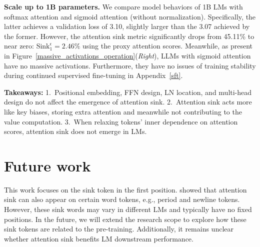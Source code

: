 \documentclass{article} \usepackage{iclr2025_conference,times}
\begin{document}
\textbf{Scale up to 1B parameters.} We compare model behaviors of 1B LMs with softmax attention and sigmoid attention (without normalization). Specifically, the latter achieves a validation loss of 3.10, slightly larger than the 3.07 achieved by the former. However, the attention sink metric significantly drops from 45.11\% to near zero: $\textrm{Sink}_1^{\epsilon}=\textrm{2.46\%}$ using the proxy attention scores. Meanwhile, as present in Figure~\ref{massive_activations_operation}(\emph{Right}), LLMs with sigmoid attention have no massive activations. Furthermore, they have no issues of training stability during continued supervised fine-tuning in Appendix~\ref{sft}.


\begin{abox}  \textbf{Takeaways:} 1.~Positional embedding, FFN design, LN location, and multi-head design do not affect the emergence of attention sink. 2.~Attention sink acts more like key biases, storing extra attention and meanwhile not contributing to the value computation. 3.~When relaxing tokens' inner dependence on attention scores, attention sink does not emerge in LMs. \end{abox}





















































%
 
\vspace{-0.1cm}
\section{Future work}
\vspace{-0.1cm}
This work focuses on the sink token in the first position. \citet{sun2024massive,yu2024unveiling} showed that attention sink can also appear on certain word tokens, e.g., period and newline tokens. However, these sink words may vary in different LMs and typically have no fixed positions. In the future, we will extend the research scope to explore how these sink tokens are related to the pre-training. Additionally, it remains unclear whether attention sink benefits LM downstream performance.
 \clearpage
%
 
\end{document}
